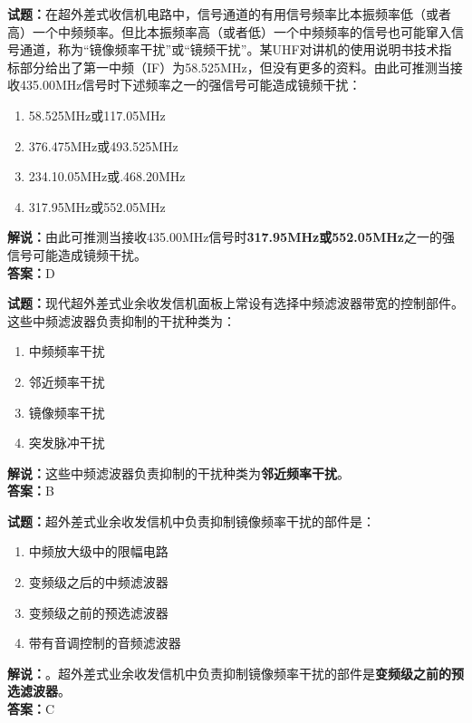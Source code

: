 \documentclass{ctexbook}
\begin{document}
\textbf{试题：}在超外差式收信机电路中，信号通道的有用信号频率比本振频率低（或者高）一个中频频率。但比本振频率高（或者低）一个中频频率的信号也可能窜入信号通道，称为“镜像频率干扰”或“镜频干扰”。某UHF对讲机的使用说明书技术指标部分给出了第一中频（IF）为58.525\unit{\MHz}，但没有更多的资料。由此可推测当接收435.00\unit{\MHz}信号时下述频率之一的强信号可能造成镜频干扰：
\begin{enumerate}[leftmargin=3em]
  \item 58.525\unit{\MHz}或117.05\unit{\MHz}
  \item 376.475\unit{\MHz}或493.525\unit{\MHz}
  \item 234.10.05\unit{\MHz}或.468.20\unit{\MHz}
  \item 317.95\unit{\MHz}或552.05\unit{\MHz}
\end{enumerate}
\noindent\textbf{解说：}由此可推测当接收435.00\unit{\MHz}信号时\textbf{317.95\unit{\MHz}或552.05\unit{\MHz}}之一的强信号可能造成镜频干扰。\\\noindent\textbf{答案：}D

\vspace{1em}

\textbf{试题：}现代超外差式业余收发信机面板上常设有选择中频滤波器带宽的控制部件。这些中频滤波器负责抑制的干扰种类为：
\begin{enumerate}[leftmargin=3em]
  \item 中频频率干扰
  \item 邻近频率干扰
  \item 镜像频率干扰
  \item 突发脉冲干扰
\end{enumerate}
\noindent\textbf{解说：}这些中频滤波器负责抑制的干扰种类为\textbf{邻近频率干扰}。\\\noindent\textbf{答案：}B

\vspace{1em}

\textbf{试题：}超外差式业余收发信机中负责抑制镜像频率干扰的部件是：
\begin{enumerate}[leftmargin=3em]
  \item 中频放大级中的限幅电路
  \item 变频级之后的中频滤波器
  \item 变频级之前的预选滤波器
  \item 带有音调控制的音频滤波器
\end{enumerate}
\noindent\textbf{解说：}。超外差式业余收发信机中负责抑制镜像频率干扰的部件是\textbf{变频级之前的预选滤波器}。\\\noindent\textbf{答案：}C
\end{document}
